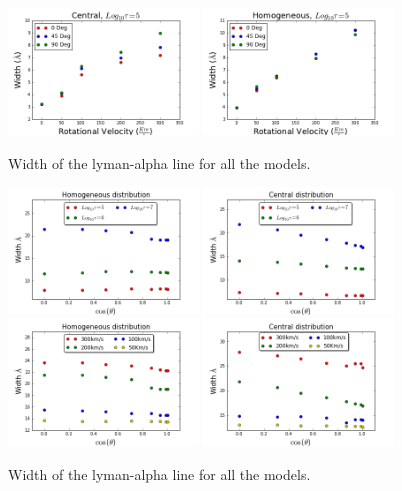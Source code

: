 \documentclass[usenatbib]{mn2e}
\begin{document}
\begin{figure}
    \includegraphics[width=0.45\textwidth]{Width5.png}
    \includegraphics[width=0.45\textwidth]{Width5HOM.png}
  \label{figure:width}\caption{Width of the lyman-alpha line for all the models. }
\end{figure}



\begin{figure}
    \includegraphics[width=0.45\textwidth]{WidthvsThetaDifODHOM.png}
    \includegraphics[width=0.45\textwidth]{WidthvsThetaDifOD.png}
    \includegraphics[width=0.45\textwidth]{WidthvsThetaDifSpeedsHOM.png}
    \includegraphics[width=0.45\textwidth]{WidthvsThetaDifSpeeds.png}
  \label{figure:widthvstheta}\caption{Width of the lyman-alpha line for all the models. }
\end{figure}
\end{document}
